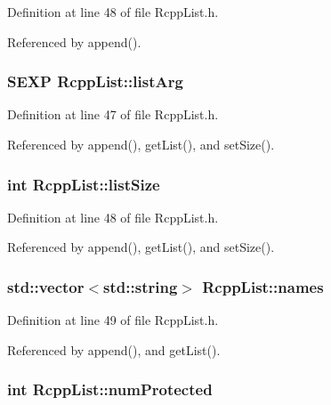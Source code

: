 Definition at line 48 of file RcppList.h.

Referenced by append().\hypertarget{classRcppList_abaa6e138e2c0153c8d95d7d7669e7330}{
\subsubsection[{listArg}]{\setlength{\rightskip}{0pt plus 5cm}SEXP {\bf RcppList::listArg}}}
\label{classRcppList_abaa6e138e2c0153c8d95d7d7669e7330}


Definition at line 47 of file RcppList.h.

Referenced by append(), getList(), and setSize().\hypertarget{classRcppList_a05ddf3e17ed3d9aebca235fccf15d383}{
\subsubsection[{listSize}]{\setlength{\rightskip}{0pt plus 5cm}int {\bf RcppList::listSize}}}
\label{classRcppList_a05ddf3e17ed3d9aebca235fccf15d383}


Definition at line 48 of file RcppList.h.

Referenced by append(), getList(), and setSize().\hypertarget{classRcppList_ad718b4509024d31cc7e894518ce909dd}{
\subsubsection[{names}]{\setlength{\rightskip}{0pt plus 5cm}std::vector$<$std::string$>$ {\bf RcppList::names}}}
\label{classRcppList_ad718b4509024d31cc7e894518ce909dd}


Definition at line 49 of file RcppList.h.

Referenced by append(), and getList().\hypertarget{classRcppList_a58644ce3af78cc421f04bafc3cc559b4}{
\subsubsection[{numProtected}]{\setlength{\rightskip}{0pt plus 5cm}int {\bf RcppList::numProtected}}}
\label{classRcppList_a58644ce3af78cc421f04bafc3cc559b4}


